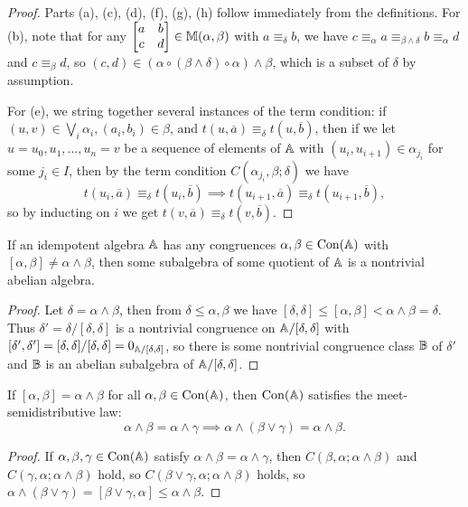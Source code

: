 \documentclass[letterpaper,11pt]{article}
\DeclareMathOperator{\Con}{Con}
\begin{document}
\begin{proof} Parts (a), (c), (d), (f), (g), (h) follow immediately from the definitions. For (b), note that for any $\begin{bmatrix} a & b\\ c & d\end{bmatrix} \in \mathbb{M}(\alpha,\beta)$ with $a \equiv_\delta b$, we have $c \equiv_\alpha a \equiv_{\beta \wedge \delta} b \equiv_\alpha d$ and $c \equiv_\beta d$, so $(c,d) \in (\alpha \circ (\beta \wedge \delta) \circ \alpha) \wedge \beta$, which is a subset of $\delta$ by assumption.

For (e), we string together several instances of the term condition: if $(u,v) \in \bigvee_i \alpha_i, (a_i,b_i) \in \beta$, and $t(u,\overline{a}) \equiv_\delta t(u,\overline{b})$, then if we let $u = u_0, u_1, ..., u_n = v$ be a sequence of elements of $\mathbb{A}$ with $(u_i, u_{i+1}) \in \alpha_{j_i}$ for some $j_i \in I$, then by the term condition $C(\alpha_{j_i},\beta;\delta)$ we have
\[
t(u_i,\overline{a})\equiv_\delta t(u_i,\overline{b}) \implies t(u_{i+1},\overline{a})\equiv_\delta t(u_{i+1},\overline{b}),
\]
so by inducting on $i$ we get $t(v,\overline{a}) \equiv_\delta t(v,\overline{b})$.
\end{proof}

\begin{cor} If an idempotent algebra $\mathbb{A}$ has any congruences $\alpha, \beta \in \Con(\bA)$ with $[\alpha,\beta] \ne \alpha \wedge \beta$, then some subalgebra of some quotient of $\mathbb{A}$ is a nontrivial abelian algebra.
\end{cor}
\begin{proof} Let $\delta = \alpha \wedge \beta$, then from $\delta \le \alpha, \beta$ we have $[\delta,\delta] \le [\alpha,\beta] < \alpha\wedge \beta = \delta$. Thus $\delta' = \delta/[\delta,\delta]$ is a nontrivial congruence on $\mathbb{A}/[\delta,\delta]$ with $[\delta',\delta'] = [\delta,\delta]/[\delta,\delta] = 0_{\mathbb{A}/[\delta,\delta]}$, so there is some nontrivial congruence class $\mathbb{B}$ of $\delta'$ and $\mathbb{B}$ is an abelian subalgebra of $\mathbb{A}/[\delta,\delta]$.
\end{proof}

\begin{prop}\label{sd-meet-commutator} If $[\alpha,\beta] = \alpha \wedge \beta$ for all $\alpha, \beta \in \Con(\bA)$, then $\Con(\bA)$ satisfies the meet-semidistributive law:
\[
\alpha \wedge \beta = \alpha\wedge \gamma \implies \alpha \wedge (\beta \vee \gamma) = \alpha \wedge \beta.
\]
\end{prop}
\begin{proof} If $\alpha,\beta,\gamma \in \Con(\bA)$ satisfy $\alpha \wedge \beta = \alpha \wedge \gamma$, then $C(\beta,\alpha;\alpha \wedge \beta)$ and $C(\gamma,\alpha;\alpha\wedge \beta)$ hold, so $C(\beta\vee \gamma,\alpha;\alpha\wedge \beta)$ holds, so $\alpha \wedge (\beta\vee \gamma) = [\beta\vee \gamma,\alpha] \le \alpha\wedge \beta$.
\end{proof}
\end{document}
